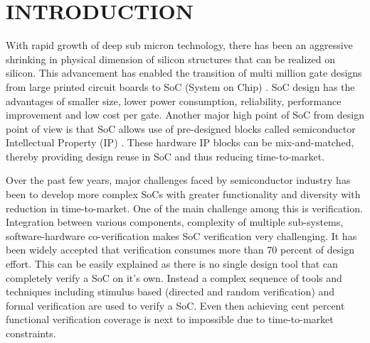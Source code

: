 \chapter{INTRODUCTION}

With rapid growth of deep sub micron technology, there has been an aggressive shrinking in physical dimension of silicon structures that can be realized on silicon. This advancement has enabled the transition of multi million gate designs from large printed circuit boards to SoC (System on Chip) . SoC design has the advantages of smaller size, lower power consumption, reliability, performance improvement and low cost per gate. Another major high point of SoC from design point of view is that SoC allows use of pre-designed blocks called semiconductor Intellectual Property (IP) . These hardware IP blocks can be mix-and-matched, thereby providing design reuse in SoC and thus reducing time-to-market\cite{ieee:SOC:2010}. 


 Over the past few years, major challenges faced by semiconductor industry has been to develop more complex SoCs with greater functionality and diversity with reduction in time-to-market. One of the main challenge among this is verification\cite{soc}. Integration between various components, complexity of multiple sub-systems, software-hardware co-verification makes SoC verification very challenging. It has been widely accepted that verification consumes more than 70 percent of design effort\cite{phd:zhang}. This can be easily explained as there is no single design tool that can completely verify a SoC on it's own. Instead a complex sequence of tools and techniques including stimulus based (directed and random verification) and formal verification are used to verify a SoC. Even then achieving cent percent functional verification coverage is next to impossible due to time-to-market constraints.



